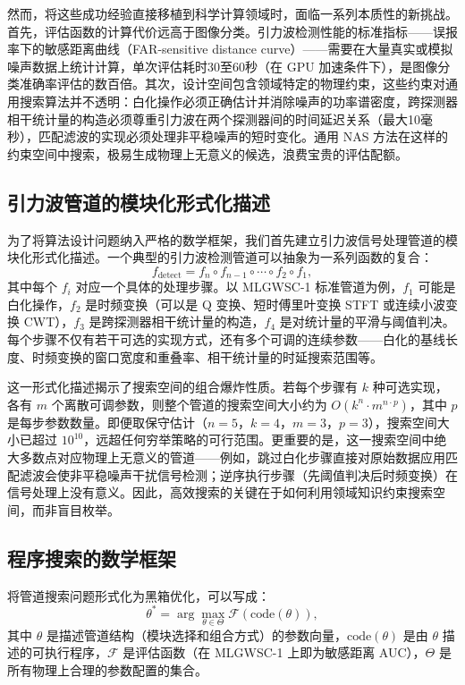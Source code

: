 然而，将这些成功经验直接移植到科学计算领域时，面临一系列本质性的新挑战。首先，评估函数的计算代价远高于图像分类。引力波检测性能的标准指标——误报率下的敏感距离曲线（FAR-sensitive distance curve）——需要在大量真实或模拟噪声数据上统计计算，单次评估耗时30至60秒（在 GPU 加速条件下），是图像分类准确率评估的数百倍。其次，设计空间包含领域特定的物理约束，这些约束对通用搜索算法并不透明：白化操作必须正确估计并消除噪声的功率谱密度，跨探测器相干统计量的构造必须尊重引力波在两个探测器间的时间延迟关系（最大10毫秒），匹配滤波的实现必须处理非平稳噪声的短时变化。通用 NAS 方法在这样的约束空间中搜索，极易生成物理上无意义的候选，浪费宝贵的评估配额。

\subsection{引力波管道的模块化形式化描述}

为了将算法设计问题纳入严格的数学框架，我们首先建立引力波信号处理管道的模块化形式化描述。一个典型的引力波检测管道可以抽象为一系列函数的复合：
\begin{equation}
f_{\text{detect}} = f_n \circ f_{n-1} \circ \cdots \circ f_2 \circ f_1,
\end{equation}
其中每个 $f_i$ 对应一个具体的处理步骤。以 MLGWSC-1 标准管道为例，$f_1$ 可能是白化操作，$f_2$ 是时频变换（可以是 Q 变换、短时傅里叶变换 STFT 或连续小波变换 CWT），$f_3$ 是跨探测器相干统计量的构造，$f_4$ 是对统计量的平滑与阈值判决。每个步骤不仅有若干可选的实现方式，还有多个可调的连续参数——白化的基线长度、时频变换的窗口宽度和重叠率、相干统计量的时延搜索范围等。

这一形式化描述揭示了搜索空间的组合爆炸性质。若每个步骤有 $k$ 种可选实现，各有 $m$ 个离散可调参数，则整个管道的搜索空间大小约为 $O(k^n \cdot m^{n \cdot p})$，其中 $p$ 是每步参数数量。即便取保守估计（$n=5$，$k=4$，$m=3$，$p=3$），搜索空间大小已超过 $10^{10}$，远超任何穷举策略的可行范围。更重要的是，这一搜索空间中绝大多数点对应物理上无意义的管道——例如，跳过白化步骤直接对原始数据应用匹配滤波会使非平稳噪声干扰信号检测；逆序执行步骤（先阈值判决后时频变换）在信号处理上没有意义。因此，高效搜索的关键在于如何利用领域知识约束搜索空间，而非盲目枚举。

\subsection{程序搜索的数学框架}

将管道搜索问题形式化为黑箱优化，可以写成：
\begin{equation}
\theta^* = \arg\max_{\theta \in \Theta} \mathcal{F}(\text{code}(\theta)),
\end{equation}
其中 $\theta$ 是描述管道结构（模块选择和组合方式）的参数向量，$\text{code}(\theta)$ 是由 $\theta$ 描述的可执行程序，$\mathcal{F}$ 是评估函数（在 MLGWSC-1 上即为敏感距离 AUC），$\Theta$ 是所有物理上合理的参数配置的集合。

